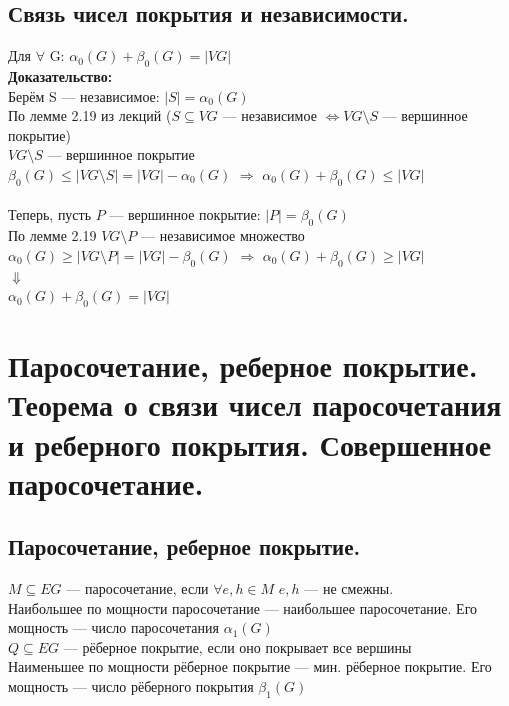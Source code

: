 \documentclass[12pt]{article}
\begin{document}
\subsection{Связь чисел покрытия и независимости.}
	Для $\forall$ G: $\alpha_0(G)+\beta_0(G)=|VG|$\\
\textbf{Доказательство:}\\
	Берём S — независимое: $|S| = \alpha_0(G)$\\
	По лемме 2.19 из лекций ($S \subseteq VG$ — независимое $\Leftrightarrow VG \setminus S$ — вершинное покрытие)\\
	$VG\setminus S$ — вершинное покрытие\\
	$\beta_0(G) \leqslant |VG \setminus S| = |VG| - \alpha_0(G)$ $\Rightarrow$ $\alpha_0(G) + \beta_0(G) \leqslant |VG|$\\\\
	Теперь, пусть $P$ — вершинное покрытие: $|P| = \beta_0(G)$\\
	По лемме 2.19 $VG \setminus P$ — независимое множество\\
	$\alpha_0(G) \geqslant |VG \setminus P| = |VG| - \beta_0(G)$ $\Rightarrow$ $\alpha_0(G) + \beta_0(G) \geqslant |VG|$\\
	$\Downarrow$\\
	$\alpha_0(G) + \beta_0(G) = |VG|$\\
	\qedsymbol

\section{Паросочетание, реберное покрытие. Теорема о связи чисел паросочетания и реберного покрытия. Совершенное паросочетание.}
	\subsection{Паросочетание, реберное покрытие.}
		$M \subseteq EG$ — паросочетание, если $\forall e,h \in M$ $e,h$ — не смежны.\\
		Наибольшее по мощности паросочетание — наибольшее паросочетание. Его мощность — число паросочетания $\alpha_1(G)$\\
		$Q \subseteq EG$ — рёберное покрытие, если оно покрывает все вершины\\
		Наименьшее по мощности рёберное покрытие — мин. рёберное покрытие. Его мощность — число рёберного покрытия $\beta_1(G)$
\end{document}
